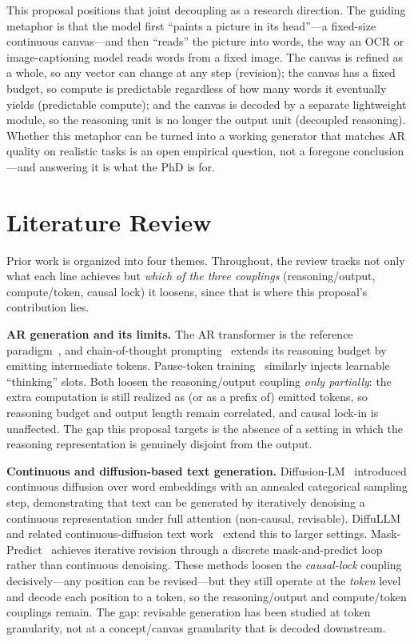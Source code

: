 \documentclass[11pt,a4paper]{article}
\begin{document}
This proposal positions that joint decoupling as a research direction. The guiding metaphor is that the model first ``paints a picture in its head''---a fixed-size continuous canvas---and then ``reads'' the picture into words, the way an OCR or image-captioning model reads words from a fixed image. The canvas is refined as a whole, so any vector can change at any step (revision); the canvas has a fixed budget, so compute is predictable regardless of how many words it eventually yields (predictable compute); and the canvas is decoded by a separate lightweight module, so the reasoning unit is no longer the output unit (decoupled reasoning). Whether this metaphor can be turned into a working generator that matches AR quality on realistic tasks is an open empirical question, not a foregone conclusion---and answering it is what the PhD is for.

\section{Literature Review}

Prior work is organized into four themes. Throughout, the review tracks not only what each line achieves but \emph{which of the three couplings} (reasoning/output, compute/token, causal lock) it loosens, since that is where this proposal's contribution lies.

\textbf{AR generation and its limits.} The AR transformer is the reference paradigm~\cite{gpt3}, and chain-of-thought prompting~\cite{chain_of_thought} extends its reasoning budget by emitting intermediate tokens. Pause-token training~\cite{pause_tokens} similarly injects learnable ``thinking'' slots. Both loosen the reasoning/output coupling \emph{only partially}: the extra computation is still realized as (or as a prefix of) emitted tokens, so reasoning budget and output length remain correlated, and causal lock-in is unaffected. The gap this proposal targets is the absence of a setting in which the reasoning representation is genuinely disjoint from the output.

\textbf{Continuous and diffusion-based text generation.} Diffusion-LM~\cite{diffusion_lm} introduced continuous diffusion over word embeddings with an annealed categorical sampling step, demonstrating that text can be generated by iteratively denoising a continuous representation under full attention (non-causal, revisable). DiffuLLM~\cite{diffullm} and related continuous-diffusion text work~\cite{diffuseq} extend this to larger settings. Mask-Predict~\cite{mask_predict} achieves iterative revision through a discrete mask-and-predict loop rather than continuous denoising. These methods loosen the \emph{causal-lock} coupling decisively---any position can be revised---but they still operate at the \emph{token} level and decode each position to a token, so the reasoning/output and compute/token couplings remain. The gap: revisable generation has been studied at token granularity, not at a concept/canvas granularity that is decoded downstream.
\end{document}
